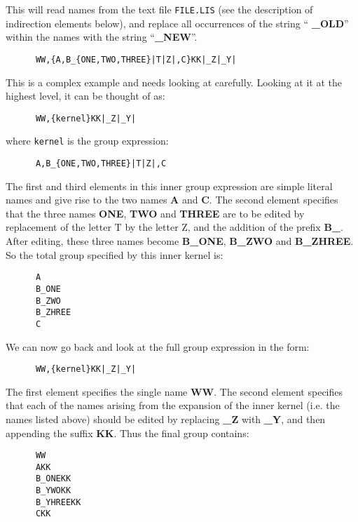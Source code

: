 This will read names from the text file {\tt FILE.LIS} (see the description of
indirection elements below), and replace all occurrences of the string ``{\bf
\_OLD}'' within the names with the string ``{\bf \_NEW}''.

\small
\begin{verbatim}
      WW,{A,B_{ONE,TWO,THREE}|T|Z|,C}KK|_Z|_Y|
\end{verbatim}
\normalsize

This is a complex example and needs looking at carefully. Looking at it at the
highest level, it can be thought of as:

\small
\begin{verbatim}
      WW,{kernel}KK|_Z|_Y|
\end{verbatim}
\normalsize

where {\tt kernel} is the group expression:

\small
\begin{verbatim}
      A,B_{ONE,TWO,THREE}|T|Z|,C
\end{verbatim}
\normalsize

The first and third elements in this inner group expression are simple literal names
and give rise to the two names {\bf A} and {\bf C}. The second element specifies
that the three names {\bf ONE}, {\bf TWO} and {\bf THREE} are to be edited by
replacement of the letter T by the letter Z, and the addition of the prefix {\bf
B\_}. After editing, these three names become {\bf B\_ONE}, {\bf B\_ZWO} and
{\bf B\_ZHREE}. So the total group specified by this inner kernel is:

\small
\begin{verbatim}
      A
      B_ONE
      B_ZWO
      B_ZHREE
      C
\end{verbatim}
\normalsize

We can now go back and look at the full group expression in the form:

\small
\begin{verbatim}
      WW,{kernel}KK|_Z|_Y|
\end{verbatim}
\normalsize

The first element specifies the single name {\bf WW}. The second element
specifies that each of the names arising from the expansion of the inner kernel
(i.e. the names listed above) should be edited by replacing {\bf \_Z} with {\bf
\_Y}, and then appending the suffix {\bf KK}. Thus the final group contains:

\small
\begin{verbatim}
      WW
      AKK
      B_ONEKK
      B_YWOKK
      B_YHREEKK
      CKK
\end{verbatim}
\normalsize

